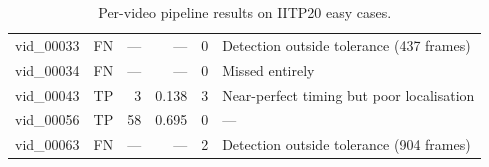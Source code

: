 \begin{table}[!htbp]
\begin{tabularx}{\textwidth}{l l r r c >{\raggedright\arraybackslash}X}
		\addlinespace
		vid\_00033     & FN               & ---                  & ---          & 0                  & Detection outside tolerance (437 frames)  \\
		\addlinespace
		vid\_00034     & FN               & ---                  & ---          & 0                  & Missed entirely                           \\
		\addlinespace
		vid\_00043     & TP               & 3                    & 0.138        & 3                  & Near-perfect timing but poor localisation \\
		\addlinespace
		vid\_00056     & TP               & 58                   & 0.695        & 0                  & ---                                       \\
		\addlinespace
		vid\_00063     & FN               & ---                  & ---          & 2                  & Detection outside tolerance (904 frames)  \\
		\bottomrule
	\end{tabularx}
	\caption{Per-video pipeline results on IITP20 easy cases.}
	\label{tab:eval_iitp20_easy}
\end{table}

